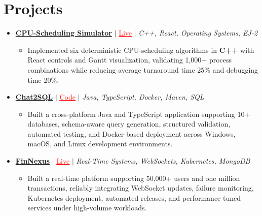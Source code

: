 \documentclass[letterpaper,10pt]{article}
\newcommand{\resumeItem}[1]{\item\small{{#1 \vspace{-3pt}}}}
\newcommand{\resumeProjectHeading}[1]{\item \small #1 \vspace{-2pt}}
\newcommand{\resumeProjectLink}[2]{\href{#1}{\textcolor{red}{\underline{#2}}}}
\newcommand{\resumeSubHeadingListStart}{\begin{itemize}[leftmargin=0.0in,label={}]}
\newcommand{\resumeSubHeadingListEnd}{\end{itemize}}
\newcommand{\resumeProjItemListStart}{\begin{itemize}[leftmargin=0.15in,label=\textbullet,itemsep=0pt,topsep=0pt,parsep=0pt,partopsep=0pt]}
\newcommand{\resumeProjItemListEnd}{\end{itemize}\vspace{1pt}}
\begin{document}
\section{Projects}
\resumeSubHeadingListStart
  \resumeProjectHeading{\href{https://cpu-scheduler-amber.vercel.app/}{\textbf{CPU-Scheduling Simulator}} $|$ \resumeProjectLink{https://cpu-scheduler-amber.vercel.app/}{Live} $|$ \emph{C++, React, Operating Systems, EJ-2}}
  \resumeProjItemListStart
    \resumeItem{Implemented six deterministic CPU-scheduling algorithms in \textbf{C++} with React controls and Gantt visualization, validating 1,000+ process combinations while reducing average turnaround time 25\% and debugging time 20\%.}
  \resumeProjItemListEnd
  \resumeProjectHeading{\href{https://github.com/SAHAJ-BHADJA/Chat2SQL}{\textbf{Chat2SQL}} $|$ \resumeProjectLink{https://github.com/SAHAJ-BHADJA/Chat2SQL}{Code} $|$ \emph{Java, TypeScript, Docker, Maven, SQL}}
  \resumeProjItemListStart
    \resumeItem{Built a cross-platform Java and TypeScript application supporting 10+ databases, schema-aware query generation, structured validation, automated testing, and Docker-based deployment across Windows, macOS, and Linux development environments.}
  \resumeProjItemListEnd
  \resumeProjectHeading{\href{https://fin-nexus.vercel.app/}{\textbf{FinNexus}} $|$ \resumeProjectLink{https://fin-nexus.vercel.app/}{Live} $|$ \emph{Real-Time Systems, WebSockets, Kubernetes, MongoDB}}
  \resumeProjItemListStart
    \resumeItem{Built a real-time platform supporting 50,000+ users and one million transactions, reliably integrating WebSocket updates, failure monitoring, Kubernetes deployment, automated releases, and performance-tuned services under high-volume workloads.}
  \resumeProjItemListEnd
\resumeSubHeadingListEnd
\end{document}

